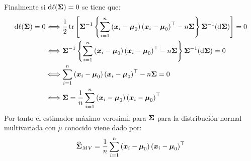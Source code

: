 Finalmente si $\de \ell (\bf{\Sigma}) = 0$ se tiene que:
\begin{align*}
\de \ell (\bf{\Sigma}) = 0 &\ssi \dfrac{1}{2}\tr\parcerrado{\bf{\Sigma}^{-1}\parllave{ \suma \parcurvo{
\bf{x}_i - \bf{\mu}_0
}\parcurvo{
\bf{x}_i - \bf{\mu}_0
}^\top
-n\bf{\Sigma}}\bf{\Sigma}^{-1}(\de \bf{\Sigma})
} = 0\\
&\ssi \bf{\Sigma}^{-1}\parllave{ \suma \parcurvo{
\bf{x}_i - \bf{\mu}_0
}\parcurvo{
\bf{x}_i - \bf{\mu}_0
}^\top
-n\bf{\Sigma}}\bf{\Sigma}^{-1}(\de \bf{\Sigma}) = 0\\
&\ssi \suma \parcurvo{
\bf{x}_i - \bf{\mu}_0
}\parcurvo{
\bf{x}_i - \bf{\mu}_0
}^\top
-n\bf{\Sigma} = 0\\
&\ssi \bf{\Sigma}=  \dfrac{1}{n} \suma \parcurvo{
\bf{x}_i - \bf{\mu}_0
}\parcurvo{
\bf{x}_i - \bf{\mu}_0
}^\top
\end{align*}
Por tanto el estimador máximo verosímil para $\bf{\Sigma}$ para la distribución normal multivariada con $\mu$ conocido viene dado por:
$$
\gorro{\bf{\Sigma}}_{MV}=  \dfrac{1}{n} \suma \parcurvo{
\bf{x}_i - \bf{\mu}_0
}\parcurvo{
\bf{x}_i - \bf{\mu}_0
}^\top
$$
